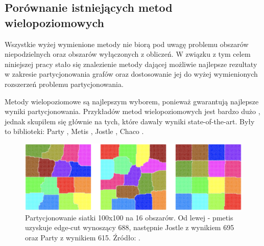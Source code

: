 \subsection{Porównanie istniejących metod wielopoziomowych}

Wszystkie wyżej wymienione metody nie biorą pod uwagę problemu obszarów niepodzielnych oraz obszarów wyłączonych z obliczeń.
W związku z tym celem niniejszej pracy stało się znalezienie metody dającej możliwie najlepsze rezultaty w zakresie partycjonowania grafów oraz
dostosowanie jej do wyżej wymienionych rozszerzeń problemu partycjonowania.

Metody wielopoziomowe są najlepszym wyborem, ponieważ gwarantują najlepsze wyniki partycjonowania.
Przykładów metod wielopoziomowych jest bardzo dużo \cite{metis, jostle, Bui1993AHF, 103500, 185177, 279334, inproceedings, 129970, 10.1145/165939.165942},
jednak skupiłem się głównie na tych, które dawały wyniki state-of-the-art. Były to biblioteki:
Party \cite{1364754}, Metis \cite{metis}, Jostle \cite{jostle}, Chaco \cite{inproceedings}.

\begin{figure}[h]
    \centering
    \includegraphics[width=0.7\linewidth]{images/libraries-comparision}
    \caption{Partycjonowanie siatki 100x100 na 16 obszarów. Od lewej - pmetis \cite{metis} uzyskuje edge-cut wynoszący
    688, następnie Jostle \cite{jostle} z wynikiem 695 oraz Party \cite{1364754} z wynikiem 615. Źródło: \cite{1364754}.}
    \label{im:partitioning_results}
\end{figure}

